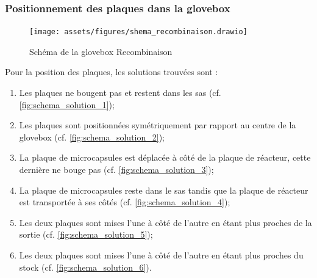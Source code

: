 \subsubsection{Positionnement des plaques dans la \gls{glovebox}}
\begin{figure}[ht]
    \centering
    \texttt{[image: assets/figures/shema\_recombinaison.drawio]}
    \caption{Schéma de la \gls{glovebox} Recombinaison}
    \label{fig:shema_recombinaison}
\end{figure}
Pour la position des plaques, les solutions trouvées sont : 
\begin{enumerate}
    \item Les plaques ne bougent pas et restent dans les sas (cf. \autoref{fig:schema_solution_1});
    \item Les plaques sont positionnées symétriquement par rapport au centre de la \gls{glovebox} (cf. \autoref{fig:schema_solution_2});
    \item La plaque de \glspl{microcapsule} est déplacée à côté de la plaque de réacteur, cette dernière ne bouge pas (cf. \autoref{fig:schema_solution_3});
    \item La plaque de \glspl{microcapsule} reste dans le sas tandis que la plaque de réacteur est transportée à ses côtés (cf. \autoref{fig:schema_solution_4});
    \item Les deux plaques sont mises l'une à côté de l'autre en étant plus proches de la sortie (cf. \autoref{fig:schema_solution_5});
    \item Les deux plaques sont mises l'une à côté de l'autre en étant plus proches du stock (cf. \autoref{fig:schema_solution_6}).
\end{enumerate} \label{list:solutions_placement_plaques}
